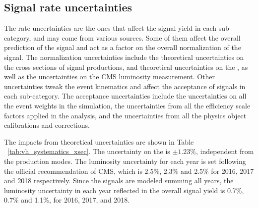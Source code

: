 \subsection{Signal rate uncertainties}\label{sec:rate_uncertainty}

The rate uncertainties are the ones that affect the signal yield in each sub-category, and may come from various sources.
Some of them affect the overall prediction of the signal and act as a factor on the overall normalization of the signal.
The normalization uncertainties include the theoretical uncertainties on the cross sections of signal productions, 
and theoretical uncertainties on the \brhmm, as well as the uncertainties on the CMS luminosity measurement.
Other uncertainties tweak the event kinematics and affect the acceptance of signals in each sub-category.
The acceptance uncertainties include the uncertainties on all the event weights in the simulation, 
the uncertainties from all the efficiency scale factors applied in the analysis, 
and the uncertainties from all the physics object calibrations and corrections.

The impacts from theoretical uncertainties are shown in Table ~\ref{tab:vh_systematics_xsec}. 
The uncertainty on the \brhmm is $\pm 1.23\%$, independent from the production modes.
The luminosity uncertainty for each year is set following the official recommendation of CMS, 
which is 2.5\%, 2.3\% and 2.5\% for 2016, 2017 and 2018 respectively. 
Since the signals are modeled summing all years, 
the luminosity uncertainty in each year reflected in the overall signal yield is 0.7\%, 0.7\% and 1.1\%, for 2016, 2017, and 2018. 


